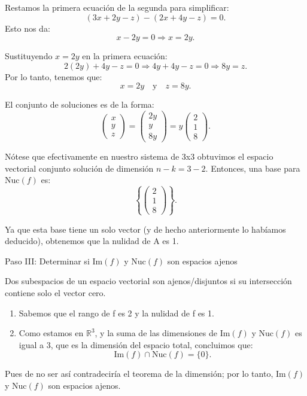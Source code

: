 \documentclass{article}
\begin{document}
Restamos la primera ecuación de la segunda para simplificar:
\[
(3x + 2y - z) - (2x + 4y - z) = 0.
\]
Esto nos da:
\[
x - 2y = 0 \Rightarrow x = 2y.
\]

Sustituyendo \( x = 2y \) en la primera ecuación:
\[
2(2y) + 4y - z = 0 \Rightarrow 4y + 4y - z = 0 \Rightarrow 8y = z.
\]
Por lo tanto, tenemos que:
\[
x = 2y \quad \text{y} \quad z = 8y.
\]

El conjunto de soluciones es de la forma:
\[
\begin{pmatrix} x \\ y \\ z \end{pmatrix} = \begin{pmatrix} 2y \\ y \\ 8y \end{pmatrix} = y \begin{pmatrix} 2 \\ 1 \\ 8 \end{pmatrix}.
\]

Nótese que efectivamente en nuestro sistema de 3x3 obtuvimos el espacio vectorial conjunto solución de dimensión $n-k=3-2$. Entonces, una base para \( \text{Nuc}(f) \) es:
\[
\left\{ \begin{pmatrix} 2 \\ 1 \\ 8 \end{pmatrix} \right\}.
\]

Ya que esta base tiene un solo vector (y de hecho anteriormente lo habíamos deducido), obtenemos que la nulidad de A es 1.

Paso III: Determinar si \( \text{Im}(f) \) y \( \text{Nuc}(f) \) son espacios ajenos

Dos subespacios de un espacio vectorial son ajenos/disjuntos si su intersección contiene solo el vector cero.
\begin{enumerate}
\item Sabemos que el rango de f es 2 y la nulidad de f es 1.
\item Como estamos en \( \mathbb{R}^3 \), y la suma de las dimensiones de \( \text{Im}(f) \) y \( \text{Nuc}(f) \) es igual a 3, que es la dimensión del espacio total, concluimos que:
   \[
   \text{Im}(f) \cap \text{Nuc}(f) = \{ 0 \}.
   \]
\end{enumerate}
Pues de no ser así contradeciría el teorema de la dimensión; por lo tanto, \( \text{Im}(f) \) y \( \text{Nuc}(f) \) son espacios ajenos.
\end{document}
